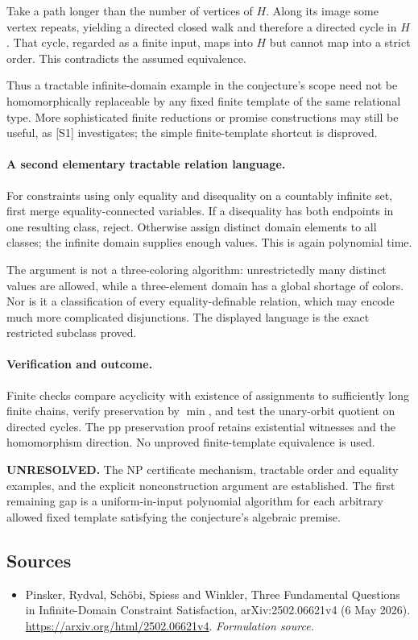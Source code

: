 \documentclass[11pt]{article}
\begin{document}
Take a path longer than the number of vertices of $H$. Along its image some vertex repeats, yielding a directed closed walk and therefore a directed cycle in $H$. That cycle, regarded as a finite input, maps into $H$ but cannot map into a strict order. This contradicts the assumed equivalence.

Thus a tractable infinite-domain example in the conjecture's scope need not be homomorphically replaceable by any fixed finite template of the same relational type. More sophisticated finite reductions or promise constructions may still be useful, as [S1] investigates; the simple finite-template shortcut is disproved.

\paragraph{A second elementary tractable relation language.}
For constraints using only equality and disequality on a countably infinite set, first merge equality-connected variables. If a disequality has both endpoints in one resulting class, reject. Otherwise assign distinct domain elements to all classes; the infinite domain supplies enough values. This is again polynomial time.

The argument is not a three-coloring algorithm: unrestrictedly many distinct values are allowed, while a three-element domain has a global shortage of colors. Nor is it a classification of every equality-definable relation, which may encode much more complicated disjunctions. The displayed language is the exact restricted subclass proved.

\paragraph{Verification and outcome.}
Finite checks compare acyclicity with existence of assignments to sufficiently long finite chains, verify preservation by $\min$, and test the unary-orbit quotient on directed cycles. The pp preservation proof retains existential witnesses and the homomorphism direction. No unproved finite-template equivalence is used.

\textbf{UNRESOLVED.} The NP certificate mechanism, tractable order and equality examples, and the explicit nonconstruction argument are established. The first remaining gap is a uniform-in-input polynomial algorithm for each arbitrary allowed fixed template satisfying the conjecture's algebraic premise.

\subsection{Sources}
\begin{itemize}
\item[S1]Pinsker, Rydval, Schöbi, Spiess and Winkler, Three Fundamental Questions in Infinite-Domain Constraint Satisfaction, arXiv:2502.06621v4 (6 May 2026).
\url{https://arxiv.org/html/2502.06621v4}.
\textit{Formulation source.}
\end{itemize}
\end{document}
